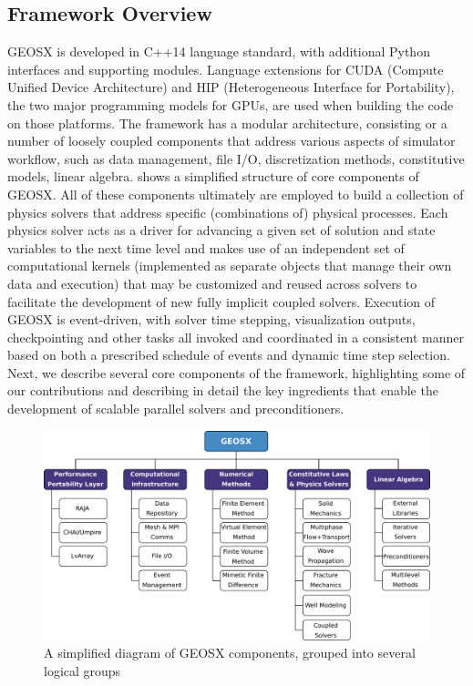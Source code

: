 \subsection{Framework Overview}
\label{subsec:geosx_overview}

GEOSX is developed in C++14 language standard, with additional Python interfaces and supporting modules.   Language extensions for CUDA (Compute Unified Device Architecture) and HIP (Heterogeneous Interface for Portability), the two major programming models for GPUs, are used when building the code on those platforms.   The framework has a modular architecture, consisting or a number of loosely coupled components that address various aspects of simulator workflow, such as data management, file I/O, discretization methods, constitutive models, linear algebra.    shows a simplified structure of core components of GEOSX.   All of these components ultimately are employed to build a collection of physics solvers that address specific (combinations of) physical processes.   Each physics solver acts as a driver for advancing a given set of solution and state variables to the next time level and makes use of an independent set of computational kernels (implemented as separate objects that manage their own data and execution) that may be customized and reused across solvers to facilitate the development of new fully implicit coupled solvers.   Execution of GEOSX is event-driven, with solver time stepping, visualization outputs, checkpointing and other tasks all invoked and coordinated in a consistent manner based on both a prescribed schedule of events and dynamic time step selection.   Next, we describe several core components of the framework, highlighting some of our contributions and describing in detail the key ingredients that enable the development of scalable parallel solvers and preconditioners.

\begin{figure} [htbp]
  \centerline{\includegraphics[width=0.9\linewidth]{figs/GEOSX/geosx}}
  \caption[Diagram of major GEOSX components]{\label{fig:geosx_components} A simplified diagram of GEOSX components, grouped into several logical groups}
\end{figure}


